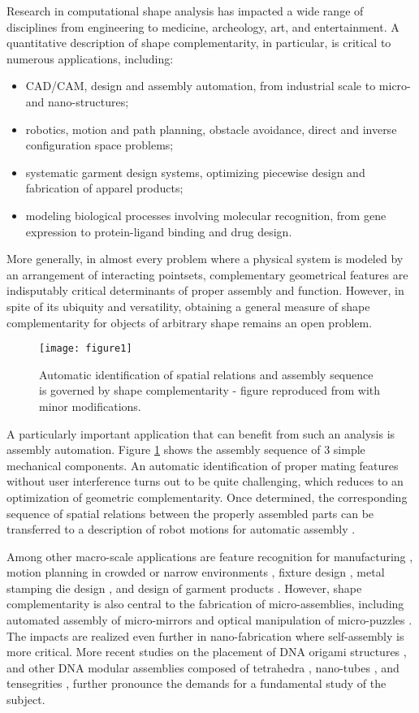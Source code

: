 \documentclass[article]{gmp2014}
\theoremstyle{definition}
\begin{document}
Research in computational shape analysis has impacted a wide range of disciplines from engineering to medicine, archeology, art, and entertainment. A quantitative description of shape complementarity, in particular, is critical to numerous applications, including:
%
\begin{itemize}
    \item CAD/CAM, design and assembly automation, from industrial scale to micro- and nano-structures;
    \item robotics, motion and path planning, obstacle avoidance, direct and inverse configuration space problems;
    \item systematic garment design systems, optimizing piecewise design and fabrication of apparel products;
    \item modeling biological processes involving molecular recognition, from gene expression to protein-ligand binding and drug design.
\end{itemize}
%
More generally, in almost every problem where a physical system is modeled by an arrangement of interacting pointsets, complementary geometrical features are indisputably critical determinants of proper assembly and function. However, in spite of its ubiquity and versatility, obtaining a general measure of shape complementarity for objects of arbitrary shape remains an open problem.

%
\begin{figure}
    \centering
    \texttt{[image: figure1]}
    \caption{Automatic identification of spatial relations and assembly sequence is governed by shape complementarity - figure reproduced from \cite{Latombe1991} with minor modifications.} \label{figure1}
\end{figure}
%

A particularly important application that can benefit from such an analysis is assembly automation. Figure \ref{figure1} shows the assembly sequence of 3 simple mechanical components. An automatic identification of proper mating features without user interference turns out to be quite challenging, which reduces to an optimization of geometric complementarity. Once determined, the corresponding sequence of spatial relations between the properly assembled parts can be transferred to a description of robot motions for automatic assembly \cite{Latombe1991}.

Among other macro-scale applications are feature recognition for manufacturing \cite{Han2000}, motion planning in crowded or narrow environments \cite{Latombe1991}, fixture design \cite{Wu1998}, metal stamping die design \cite{Cheok1998}, and design of garment products \cite{Wang2005a}. However, shape complementarity is also central to the fabrication of micro-assemblies, including automated assembly of micro-mirrors \cite{Reid1998} and optical manipulation of micro-puzzles \cite{Rodrigo2007}. The impacts are realized even further in nano-fabrication where self-assembly is more critical. More recent studies on the placement of DNA origami structures \cite{Woo2011}, and other DNA modular assemblies composed of tetrahedra \cite{Goodman2008}, nano-tubes \cite{Aldaye2009}, and tensegrities \cite{Liedl2010}, further pronounce the demands for a fundamental study of the subject.
\end{document}
